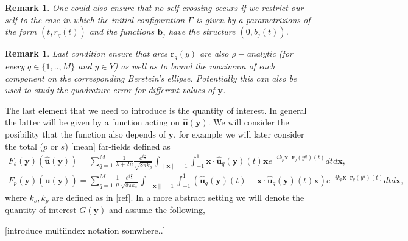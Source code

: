 \documentclass{article}
\newtheorem{remark}[theorem]{Remark}
\newcommand{\todo}[1]{{\color{red}[#1]}}
\begin{document}
\begin{remark}
One could also ensure that no self crossing occurs if we restrict our-self to the case in which the initial configuration $\Gamma$ is given by a parametrizions of the form $(t, r_q(t))$ and the functions $\mathbf{b}_j $ have  the structure  $(0, b_j(t))$. 
\end{remark}

\begin{remark}
Last condition ensure that arcs $\mathbf{r}_q(y)$ are also $\rho-$analytic (for every $q \in \{1,..,M\}$ and $y \in Y$) as well as to bound the maximum of each component on the corresponding Berstein's ellipse. Potentially this can also be used to study the quadrature error for different values of $\mathbf{y}$. 
\end{remark}
The last element that we need to introduce is the quantity of interest. In general the latter will be given by a function acting on $\widehat{\mathbf{u}}(\mathbf{y})$. We will consider the posibility that the function also depends of $\mathbf{y}$, for example we will later consider the total ($p$ or $s$) \todo{mean} far-fields defined as 
\begin{align*}
F_s(\mathbf{y})(\widehat{\mathbf{u}}(\mathbf{y})) =  \sum_{q=1}^M
  \frac{1}{\lambda+2\mu}\frac{e^{i\frac{\pi}{4}}}{\sqrt{8 \pi k_p }} 
  \int_{\| \mathbf{x}\| = 1}\int_{-1}^1 \mathbf{x} \cdot \widehat{\mathbf{u}}_q(\mathbf{y}) (t) \mathbf{x} e^{-i k_p \mathbf{x} \cdot \mathbf{r}_q(y^q)(t)} dt d\mathbf{x}, \\
F_p(\mathbf{y})(\widehat{\mathbf{u}}(\mathbf{y})) = \sum_{q=1}^M
  \frac{1}{\mu}\frac{e^{i\frac{\pi}{4}}}{\sqrt{8 \pi k_s }} 
  \int_{\| \mathbf{x}\| = 1}
  \int_{-1}^1 \left( 
  \widehat{\mathbf{u}}_q(\mathbf{y}) (t)-
    \mathbf{x} \cdot \widehat{\mathbf{u}}_q(\mathbf{y}) (t) \mathbf{x} \right) e^{-i k_p \mathbf{x} \cdot \mathbf{r}_q(y^q)(t)} dt    d\mathbf{x},
\end{align*} 
where $k_s , k_p$ are defined as in \todo{ref}. In a more abstract setting we will denote the quantity of interest $G(\mathbf{y})$ and assume the following,

\todo{introduce multiindex notation somwhere..}
\end{document}
